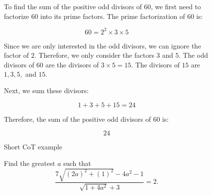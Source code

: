


\begin{figure*}[htbp]
    \centering
\begin{tcolorbox}[title=Short CoT Example, promptstyle]
\lstset{
    basicstyle=\normalfont\sffamily\footnotesize,
    breaklines=true,
    frame=none,
    columns=fullflexible,
}

To find the sum of the positive odd divisors of $60$, we first need to factorize $60$ into its prime factors. The prime factorization of $60$ is:

\[
60 = 2^2 \times 3 \times 5
\]

Since we are only interested in the odd divisors, we can ignore the factor of $2$. Therefore, we only consider the factors $3$ and $5$. The odd divisors of $60$ are the divisors of $3 \times 5 = 15$. The divisors of $15$ are \(1, 3, 5,\) and \(15\).

Next, we sum these divisors:

\[
1 + 3 + 5 + 15 = 24
\]

Therefore, the sum of the positive odd divisors of $60$ is:

\[
\boxed{24}
\]

\end{tcolorbox}
    \label{fig: short cot example}
    \caption{Short CoT example}
\end{figure*}




\begin{figure*}[htbp]
    \centering
\begin{tcolorbox}[title=Problem, promptstyle]
\lstset{
    basicstyle=\normalfont\sffamily\footnotesize,
    breaklines=true,
    frame=none,
    columns=fullflexible,
}
Find the greatest \( a \) such that
\[
\frac{7\sqrt{(2a)^2+(1)^2}-4a^2-1}{\sqrt{1+4a^2}+3}=2.
\]
\end{tcolorbox}
\end{figure*}



